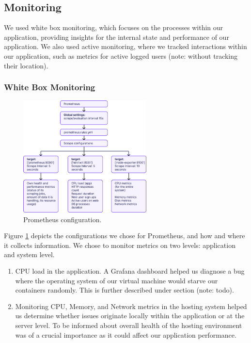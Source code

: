 \documentclass{article}
\begin{document}
\subsection{Monitoring}

We used white box monitoring, which focuses on the processes within our application, providing insights for the internal state and performance of our application. We also used active monitoring, where we tracked interactions within our application, such as metrics for active logged users (note: without tracking their location).

\subsubsection{White Box Monitoring}

\begin{figure}[ht]
    \centering
    \includegraphics[width=0.6\textwidth]{./images/prometheus_configuration_v2.png} 
    \caption{Prometheus configuration.}
    \label{fig:prometheus_configuration}
\end{figure}

Figure \ref{fig:prometheus_configuration} depicts the configurations we chose for Prometheus, and how and where it collects information. We chose to monitor metrics on two levels: application and system level.

\begin{enumerate}
    \item CPU load in the application. A Grafana dashboard helped us diagnose a bug where the operating system of our virtual machine would starve our containers randomly. This is further described under section (note: todo).
    \item Monitoring CPU, Memory, and Network metrics in the hosting system helped us determine whether issues originate locally within the application or at the server level. To be informed about overall health of the hosting environment was of a crucial importance as it could affect our application performance.
\end{enumerate}
\end{document}

